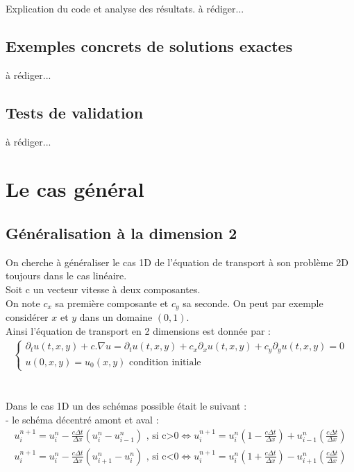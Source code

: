 \documentclass[12pt]{article}
\begin{document}
\noindent Explication du code et analyse des résultats.
à rédiger...


\subsection{Exemples concrets de solutions exactes}
à rédiger...


\subsection{Tests de validation}
à rédiger...

\section{Le cas général}
\subsection{Généralisation à la dimension 2}
\noindent On cherche à généraliser le cas 1D de l'équation de transport à son problème 2D toujours dans le cas linéaire.
\\ Soit c un vecteur vitesse à deux composantes.
\\On note $c_x$ sa première composante et $c_y$ sa seconde.
On peut par exemple considérer $x$ et $y$ dans un domaine $(0,1)$.
\\Ainsi l'équation de transport en 2 dimensions est donnée par :
\\
\begin{eqnarray*}
      \left\{
        \begin{array}{llll}
            \partial_tu(t,x,y)+c.\nabla u=\partial_tu(t,x,y) +c_x\partial_xu(t,x,y)+c_y\partial_yu(t,x,y)=0
            \\ u(0,x,y)=u_0(x,y) \text{ condition initiale}
        \end{array}
    \right .
\end{eqnarray*}
\\
\\Dans le cas 1D un des schémas possible était le suivant :
\\- le schéma décentré amont et aval :
\begin{eqnarray*}
        u^{n+1}_i=u_i^n-\frac{c\Delta t}{\Delta x}({u_{i}^n-u_{i-1}^n}) \text{       , si c>0}
        \iff u^{n+1}_i=u_i^n\left(1-\frac{c\Delta t}{\Delta x}\right)+u_{i-1}^n\left(\frac{c\Delta t}{\Delta x}\right)	
        \\u^{n+1}_i=u_i^n-\frac{c\Delta t}{\Delta x}({u_{i+1}^n-u_{i}^n}) \text{       , si c<0}
        \iff u^{n+1}_i=u_i^n\left(1+\frac{c\Delta t}{\Delta x}\right)-u_{i+1}^n\left(\frac{c\Delta t}{\Delta x}\right)
\end{eqnarray*}
\end{document}
